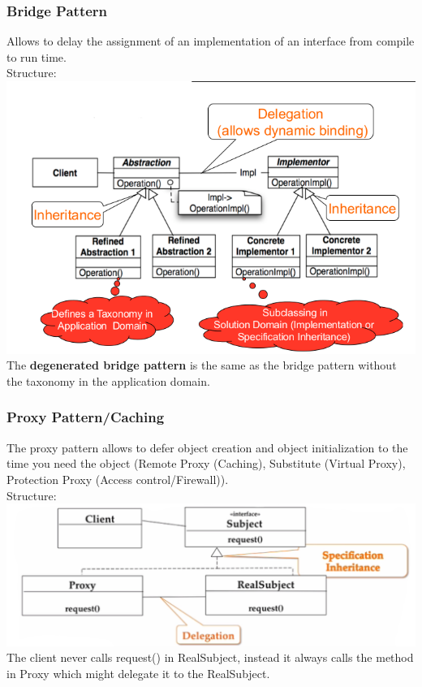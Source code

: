 \subsubsection{Bridge Pattern}
Allows to delay the assignment of an implementation of an interface from compile to run time.\\
Structure:\\
\includegraphics[width=\linewidth]{design_pattern/bridge.png}
The \textbf{degenerated bridge pattern} is the same as the bridge pattern without the taxonomy in the application domain.

\subsubsection{Proxy Pattern/Caching}
The proxy pattern allows to defer object creation and object initialization to the time you need the object (Remote Proxy (Caching), Substitute (Virtual Proxy), Protection Proxy (Access control/Firewall)).\\
Structure:\\
\includegraphics[width=\linewidth]{design_pattern/proxy.png}
The client never calls request() in RealSubject, instead it always calls the method in Proxy which might delegate it to the RealSubject.

